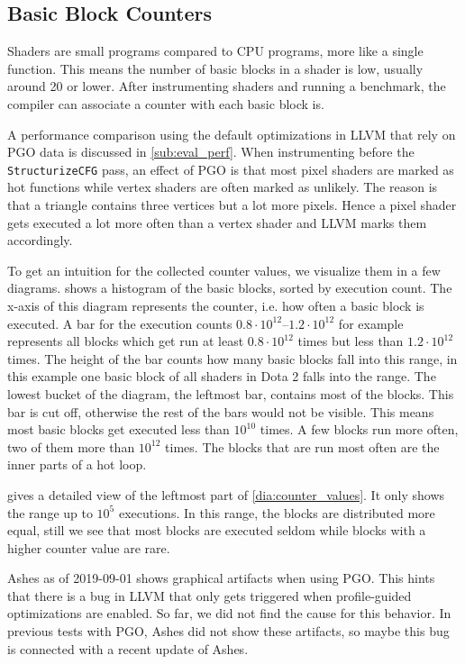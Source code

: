 \subsection{Basic Block Counters}
\label{sub:eval_counters}
Shaders are small programs compared to CPU programs, more like a single function.
This means the number of basic blocks in a shader is low, usually around 20 or lower.
After instrumenting shaders and running a benchmark, the compiler can associate a counter with each basic block is.

A performance comparison using the default optimizations in LLVM that rely on PGO data is discussed in \cref{sub:eval_perf}.
When instrumenting before the \texttt{StructurizeCFG} pass, an effect of PGO is that most pixel shaders are marked as hot functions while vertex shaders are often marked as unlikely.
The reason is that a triangle contains three vertices but a lot more pixels.
Hence a pixel shader gets executed a lot more often than a vertex shader and LLVM marks them accordingly.

To get an intuition for the collected counter values, we visualize them in a few diagrams.
 shows a histogram of the basic blocks, sorted by execution count.
The x-axis of this diagram represents the counter, i.e. how often a basic block is executed.
A bar for the execution counts $0.8\cdot 10^{12}$--$1.2\cdot 10^{12}$ for example represents all blocks which get run at least $0.8\cdot 10^{12}$ times but less than $1.2\cdot 10^{12}$ times.
The height of the bar counts how many basic blocks fall into this range, in this example one basic block of all shaders in Dota 2 falls into the range.
The lowest bucket of the diagram, the leftmost bar, contains most of the blocks.
This bar is cut off, otherwise the rest of the bars would not be visible.
This means most basic blocks get executed less than $10^{10}$ times.
A few blocks run more often, two of them more than $10^{12}$ times.
The blocks that are run most often are the inner parts of a hot loop.


 gives a detailed view of the leftmost part of \cref{dia:counter_values}.
It only shows the range up to $10^5$ executions.
In this range, the blocks are distributed more equal, still we see that most blocks are executed seldom while blocks with a higher counter value are rare.


Ashes as of 2019-09-01 shows graphical artifacts when using PGO.
This hints that there is a bug in LLVM that only gets triggered when profile-guided optimizations are enabled.
So far, we did not find the cause for this behavior.
In previous tests with PGO, Ashes did not show these artifacts, so maybe this bug is connected with a recent update of Ashes.

